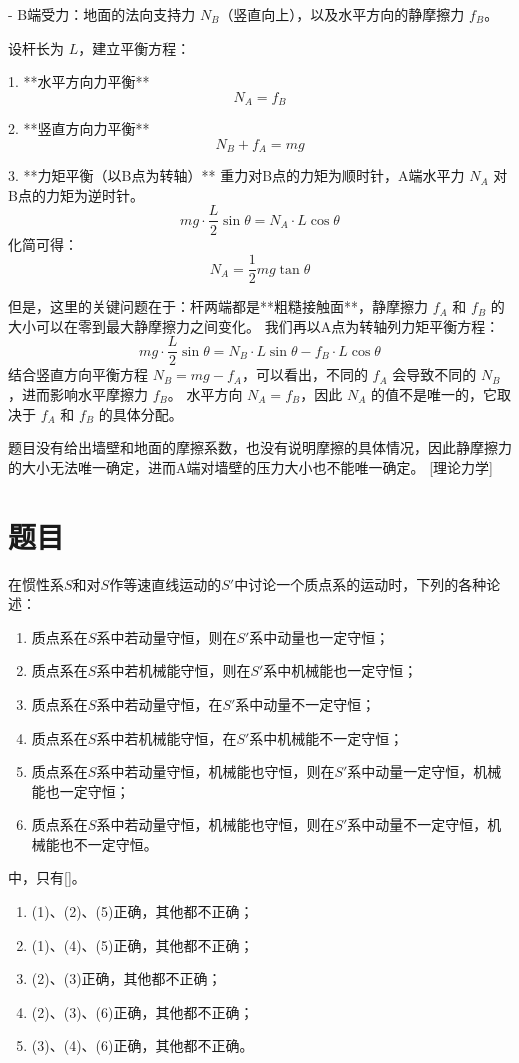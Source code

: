 \documentclass[11pt,a4paper]{article}
\begin{document}
- B端受力：地面的法向支持力 $N_B$（竖直向上），以及水平方向的静摩擦力 $f_B$。

设杆长为 $L$，建立平衡方程：

1.  **水平方向力平衡**
    \[
    N_A = f_B
    \]

2.  **竖直方向力平衡**
    \[
    N_B + f_A = mg
    \]

3.  **力矩平衡（以B点为转轴）**
    重力对B点的力矩为顺时针，A端水平力 $N_A$ 对B点的力矩为逆时针。
    \[
    mg \cdot \frac{L}{2} \sin\theta = N_A \cdot L \cos\theta
    \]
    化简可得：
    \[
    N_A = \frac{1}{2} mg \tan\theta
    \]

    但是，这里的关键问题在于：杆两端都是**粗糙接触面**，静摩擦力 $f_A$ 和 $f_B$ 的大小可以在零到最大静摩擦力之间变化。
    我们再以A点为转轴列力矩平衡方程：
    \[
    mg \cdot \frac{L}{2} \sin\theta = N_B \cdot L \sin\theta - f_B \cdot L \cos\theta
    \]
    结合竖直方向平衡方程 $N_B = mg - f_A$，可以看出，不同的 $f_A$ 会导致不同的 $N_B$，进而影响水平摩擦力 $f_B$。
    水平方向 $N_A = f_B$，因此 $N_A$ 的值不是唯一的，它取决于 $f_A$ 和 $f_B$ 的具体分配。

题目没有给出墙壁和地面的摩擦系数，也没有说明摩擦的具体情况，因此静摩擦力的大小无法唯一确定，进而A端对墙壁的压力大小也不能唯一确定。
[理论力学]

\section*{题目}
在惯性系$S$和对$S$作等速直线运动的$S'$中讨论一个质点系的运动时，下列的各种论述：
\begin{enumerate}
    \item 质点系在$S$系中若动量守恒，则在$S'$系中动量也一定守恒；
    \item 质点系在$S$系中若机械能守恒，则在$S'$系中机械能也一定守恒；
    \item 质点系在$S$系中若动量守恒，在$S'$系中动量不一定守恒；
    \item 质点系在$S$系中若机械能守恒，在$S'$系中机械能不一定守恒；
    \item 质点系在$S$系中若动量守恒，机械能也守恒，则在$S'$系中动量一定守恒，机械能也一定守恒；
    \item 质点系在$S$系中若动量守恒，机械能也守恒，则在$S'$系中动量不一定守恒，机械能也不一定守恒。
\end{enumerate}
中，只有[\hspace{1em}]。

\begin{enumerate}[label=\Alph*.]
    \item (1)、(2)、(5)正确，其他都不正确；
    \item (1)、(4)、(5)正确，其他都不正确；
    \item (2)、(3)正确，其他都不正确；
    \item (2)、(3)、(6)正确，其他都不正确；
    \item (3)、(4)、(6)正确，其他都不正确。
\end{enumerate}
\end{document}
